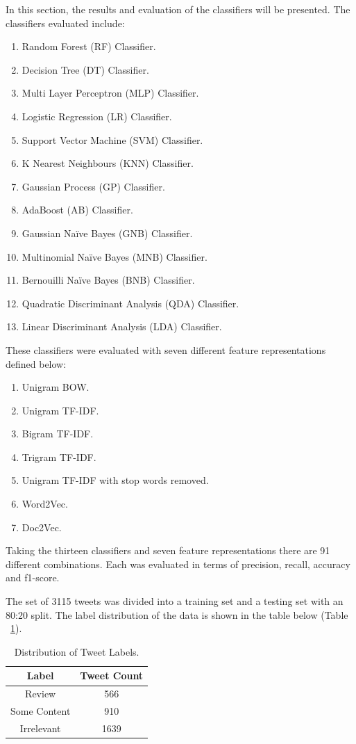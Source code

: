In this section, the results and evaluation of the classifiers will be presented. The classifiers evaluated include:
\begin{enumerate}
    \item Random Forest (RF) Classifier.
    \item Decision Tree (DT) Classifier.
    \item Multi Layer Perceptron (MLP) Classifier.
    \item Logistic Regression (LR) Classifier.    
    \item Support Vector Machine (SVM) Classifier.
    \item K Nearest Neighbours (KNN) Classifier.
    \item Gaussian Process (GP) Classifier.
    \item AdaBoost (AB) Classifier.
    \item Gaussian Naïve Bayes (GNB) Classifier.
    \item Multinomial Naïve Bayes (MNB) Classifier.
    \item Bernouilli Naïve Bayes (BNB) Classifier.
    \item Quadratic Discriminant Analysis (QDA) Classifier.
    \item Linear Discriminant Analysis (LDA) Classifier.
\end{enumerate}

These classifiers were evaluated with seven different feature representations defined below:
\begin{enumerate}
    \item Unigram BOW.
    \item Unigram TF-IDF.
    \item Bigram TF-IDF.
    \item Trigram TF-IDF.
    \item Unigram TF-IDF with stop words removed.
    \item Word2Vec.
    \item Doc2Vec.
\end{enumerate}

Taking the thirteen classifiers and seven feature representations there are 91 different combinations. Each was evaluated in terms of precision, recall, accuracy and f1-score.

The set of 3115 tweets was divided into a training set and a testing set with an 80:20 split. The label distribution of the data is shown in the table below (Table ~\ref{Table:tweetlabels}).

\begin{table}[h!]
\setlength\extrarowheight{5pt}
\caption{Distribution of Tweet Labels.}
\label{Table:tweetlabels}
\begin{tabular}{|c|c|}
\hline
\textbf{Label} & \textbf{Tweet Count} \\ \hline
Review         & 566                  \\ \hline
Some Content   & 910                  \\ \hline
Irrelevant     & 1639                 \\ \hline
\end{tabular}
\end{table}

